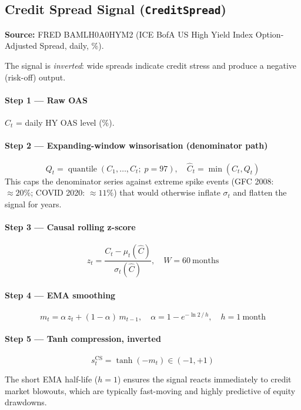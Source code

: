 \documentclass[11pt, a4paper]{article}
\begin{document}
\subsection{Credit Spread Signal (\texttt{CreditSpread})}
\label{sec:credit}

\textbf{Source:} FRED BAMLH0A0HYM2 (ICE BofA US High Yield Index
Option-Adjusted Spread, daily, \%).

The signal is \emph{inverted}: wide spreads indicate credit stress and
produce a negative (risk-off) output.

\paragraph{Step 1 — Raw OAS}
$C_t$ = daily HY OAS level (\%).

\paragraph{Step 2 — Expanding-window winsorisation (denominator path)}
\[
  Q_t = \operatorname{quantile}(C_1,\ldots,C_t;\;p=97),
  \quad \hat{C}_t = \min(C_t, Q_t)
\]
This caps the denominator series against extreme spike events (GFC 2008:
$\approx 20\%$; COVID 2020: $\approx 11\%$) that would otherwise inflate
$\sigma_t$ and flatten the signal for years.

\paragraph{Step 3 — Causal rolling z-score}
\[
  z_t = \frac{C_t - \mu_t(\hat{C})}{\sigma_t(\hat{C})},
  \quad W = 60\ \text{months}
\]

\paragraph{Step 4 — EMA smoothing}
\[
  m_t = \alpha\, z_t + (1-\alpha)\, m_{t-1},
  \quad \alpha = 1 - e^{-\ln 2\,/\,h},\quad h = 1\ \text{month}
\]

\paragraph{Step 5 — Tanh compression, inverted}
\[
  \boxed{s_t^{\text{CS}} = \tanh(-m_t) \in (-1,+1)}
\]

The short EMA half-life ($h = 1$) ensures the signal reacts immediately to
credit market blowouts, which are typically fast-moving and highly predictive
of equity drawdowns.
\end{document}
